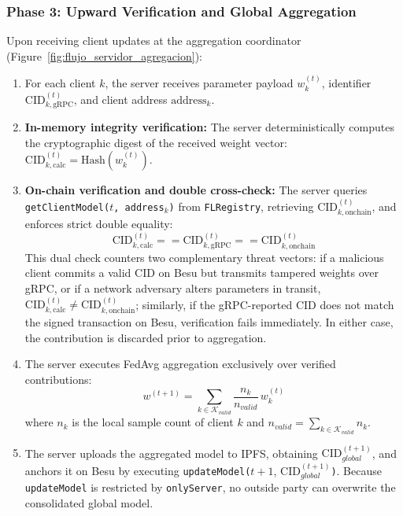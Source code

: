 \subsubsection{Phase 3: Upward Verification and Global Aggregation}
Upon receiving client updates at the aggregation coordinator (Figure~\ref{fig:flujo_servidor_agregacion}):
\begin{enumerate}
    \item For each client $k$, the server receives parameter payload $w_k^{(t)}$, identifier $\text{CID}_{k,\text{gRPC}}^{(t)}$, and client address $\text{address}_k$.
    \item \textbf{In-memory integrity verification:} The server deterministically computes the cryptographic digest of the received weight vector: $\text{CID}_{k,\text{calc}}^{(t)} = \text{Hash}(w_k^{(t)})$.
    \item \textbf{On-chain verification and double cross-check:} The server queries \texttt{getClientModel($t$, address$_k$)} from \texttt{FLRegistry}, retrieving $\text{CID}_{k,\text{onchain}}^{(t)}$, and enforces strict double equality:
    \begin{equation}
    \text{CID}_{k,\text{calc}}^{(t)} == \text{CID}_{k,\text{gRPC}}^{(t)} == \text{CID}_{k,\text{onchain}}^{(t)}
    \end{equation}
    This dual check counters two complementary threat vectors: if a malicious client commits a valid CID on Besu but transmits tampered weights over gRPC, or if a network adversary alters parameters in transit, $\text{CID}_{k,\text{calc}}^{(t)} \neq \text{CID}_{k,\text{onchain}}^{(t)}$; similarly, if the gRPC-reported CID does not match the signed transaction on Besu, verification fails immediately. In either case, the contribution is discarded prior to aggregation.
    \item The server executes FedAvg aggregation exclusively over verified contributions:
    \begin{equation}
    w^{(t+1)} = \sum_{k \in \mathcal{K}_{valid}} \frac{n_k}{n_{valid}} \, w_k^{(t)}
    \end{equation}
    where $n_k$ is the local sample count of client $k$ and $n_{valid} = \sum_{k \in \mathcal{K}_{valid}} n_k$.
    \item The server uploads the aggregated model to IPFS, obtaining $\text{CID}_{global}^{(t+1)}$, and anchors it on Besu by executing \texttt{updateModel(}$t+1$, $\text{CID}_{global}^{(t+1)}$\texttt{)}. Because \texttt{updateModel} is restricted by \texttt{onlyServer}, no outside party can overwrite the consolidated global model.
\end{enumerate}

